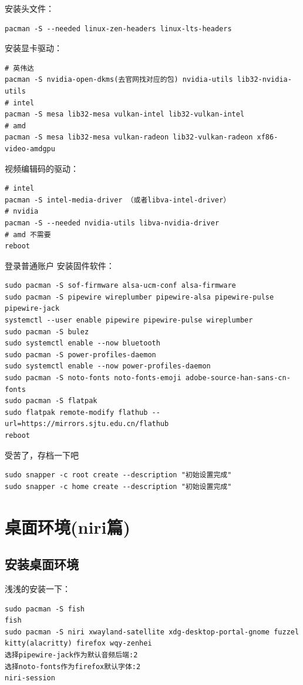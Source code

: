 \documentclass[a4paper, twocolumn, twoside, 10pt]{article}
\begin{document}
安装头文件：
\begin{lstlisting}
pacman -S --needed linux-zen-headers linux-lts-headers
\end{lstlisting}

安装显卡驱动：
\begin{lstlisting}
# 英伟达
pacman -S nvidia-open-dkms(去官网找对应的包) nvidia-utils lib32-nvidia-utils
# intel 
pacman -S mesa lib32-mesa vulkan-intel lib32-vulkan-intel
# amd
pacman -S mesa lib32-mesa vulkan-radeon lib32-vulkan-radeon xf86-video-amdgpu
\end{lstlisting}

视频编辑码的驱动：
\begin{lstlisting}
# intel
pacman -S intel-media-driver （或者libva-intel-driver）
# nvidia
pacman -S --needed nvidia-utils libva-nvidia-driver
# amd 不需要
reboot
\end{lstlisting}

登录普通账户
安装固件软件：
\begin{lstlisting}
sudo pacman -S sof-firmware alsa-ucm-conf alsa-firmware
sudo pacman -S pipewire wireplumber pipewire-alsa pipewire-pulse pipewire-jack
systemctl --user enable pipewire pipewire-pulse wireplumber
sudo pacman -S bulez
sudo systemctl enable --now bluetooth
sudo pacman -S power-profiles-daemon
sudo systemctl enable --now power-profiles-daemon
sudo pacman -S noto-fonts noto-fonts-emoji adobe-source-han-sans-cn-fonts
sudo pacman -S flatpak
sudo flatpak remote-modify flathub --url=https://mirrors.sjtu.edu.cn/flathub
reboot
\end{lstlisting}

受苦了，存档一下吧
\begin{lstlisting}
sudo snapper -c root create --description "初始设置完成"
sudo snapper -c home create --description "初始设置完成"
\end{lstlisting}

\section{桌面环境(niri篇)}

\subsection{安装桌面环境}

浅浅的安装一下：
\begin{lstlisting}
sudo pacman -S fish
fish
sudo pacman -S niri xwayland-satellite xdg-desktop-portal-gnome fuzzel kitty(alacritty) firefox wqy-zenhei
选择pipewire-jack作为默认音频后端:2
选择noto-fonts作为firefox默认字体:2
niri-session
\end{lstlisting}
\end{document}
